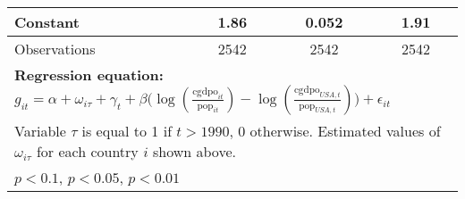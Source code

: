 \begin{sidewaystable}[htbp]
\begin{tabular}{l*{3}{c}}
Constant        &     1.86\sym{***}&    0.052         &     1.91\sym{*}  \\
\midrule
Observations    &     2542         &     2542         &     2542         \\
\bottomrule
\multicolumn{4}{l}{\footnotesize \textbf{Regression equation:} \(g_{it} = \alpha + \omega_{i\tau} + \gamma_t + \beta \big(\log (\frac{\textrm{cgdpo}_{it}}{\textrm{pop}_{it}} ) - \log (\frac{\textrm{cgdpo}_{USA,t}}{\textrm{pop}_{USA,t}}  ) \big) + \epsilon_{it}\)}\\
\multicolumn{4}{l}{\footnotesize Variable \(\tau\) is equal to 1 if \(t > 1990\), 0 otherwise. Estimated values of \(\omega_{i\tau}\) for each country \(i\) shown above.}\\
\multicolumn{4}{l}{\footnotesize \sym{*} \(p<0.1\), \sym{**} \(p<0.05\), \sym{***} \(p<0.01\)}\\
\end{tabular}
\end{sidewaystable}
